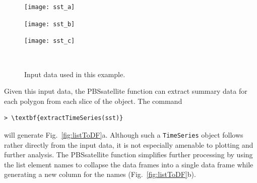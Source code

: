 \documentclass[11pt]{report}
\begin{document}
\begin{figure}[!h]
  \centering
  \begin{minipage}[b]{.30\linewidth}
    \texttt{[image: sst\_a]}
  \end{minipage}\hspace{5mm}
  \begin{minipage}[b]{0.30\linewidth}
    \texttt{[image: sst\_b]}
  \end{minipage}\hspace{5mm}
  \begin{minipage}[b]{0.30\linewidth}
    \texttt{[image: sst\_c]}
  \end{minipage}\\
  \begin{minipage}[t]{0.30\linewidth}
  \end{minipage}\hspace{5mm}
  \begin{minipage}[t]{0.30\linewidth}
  \end{minipage}\hspace{5mm}
  \begin{minipage}[t]{0.30\linewidth}
  \end{minipage}
  \caption{Input data used in this example.}
  \label{fig:sst}
\end{figure}

Given this input data, the PBSsatellite function  can extract summary data for each polygon from each slice of the  object.
The command
\begin{Verbatim}[xleftmargin=.5in,commandchars=\\\{\},samepage=true]
> \textbf{extractTimeSeries(sst)}
\end{Verbatim}
will generate Fig.~\ref{fig:listToDF}a.
Although such a \lstinline{TimeSeries} object follows rather directly from the input data, it is not especially amenable to plotting and further analysis.
The PBSsatellite function  simplifies further processing by using the list element names to collapse the data frames into a single data frame while generating a new column for the names (Fig.~\ref{fig:listToDF}b). 
\end{document}
